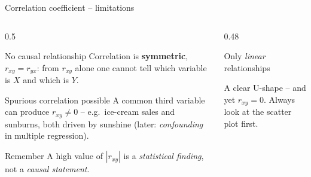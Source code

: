 \documentclass[aspectratio=169,11pt]{beamer}
\begin{document}
\begin{frame}{Correlation coefficient -- limitations}
  \begin{columns}[T]
    \begin{column}{0.5\textwidth}
      \small
      \begin{alertblock}{No causal relationship}
        Correlation is \textbf{symmetric}, $r_{xy} = r_{yx}$: from $r_{xy}$
        alone one cannot tell which variable is $X$ and which is $Y$.
      \end{alertblock}
      \begin{alertblock}{Spurious correlation possible}
        A common third variable can produce $r_{xy} \ne 0$ -- e.g.\
        ice-cream sales and sunburns, both driven by sunshine (later:
        \emph{confounding} in multiple regression).
      \end{alertblock}
      \begin{block}{Remember}
        A high value of $|r_{xy}|$ is a \emph{statistical finding}, not a
        \emph{causal statement}.
      \end{block}
    \end{column}
    \begin{column}{0.48\textwidth}
      \small
      \begin{alertblock}{Only \emph{linear} relationships}
        \begin{center}
        \end{center}
        A clear U-shape -- and yet $r_{xy} = 0$. Always look at the scatter
        plot first.
      \end{alertblock}
    \end{column}
  \end{columns}
\end{frame}
\end{document}

